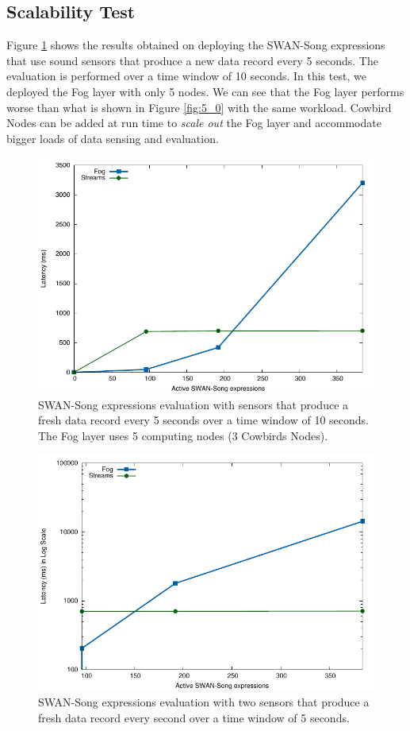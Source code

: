 \subsection{Scalability Test}
Figure \ref{fig:5_0_3_nodes} shows the results obtained on deploying the SWAN-Song expressions that use sound sensors that produce a new data record every 5 seconds. The evaluation is performed over a time window of 10 seconds. In this test, we deployed the Fog layer with only 5 nodes. We can see that the Fog layer performs worse than what is shown in Figure \ref{fig:5_0} with the same workload. Cowbird Nodes can be added at run time to \emph{scale out} the Fog layer and accommodate bigger loads of data sensing and evaluation.

 \begin{figure}[h!]
\includegraphics[width=1\textwidth]{images/5_0_3_node.pdf}
 \caption{SWAN-Song expressions evaluation with sensors that produce a fresh data record every 5 seconds over a time window of 10 seconds. The Fog layer uses 5 computing nodes (3 Cowbirds Nodes).}
\label{fig:5_0_3_nodes}
\end{figure}


 \begin{figure}[h!]
\includegraphics[width=1\textwidth]{images/2_expressions.pdf}
 \caption{SWAN-Song expressions evaluation with two sensors that produce a fresh data record every second over a time window of 5 seconds.}
\label{fig:2_sensors}
\end{figure}

